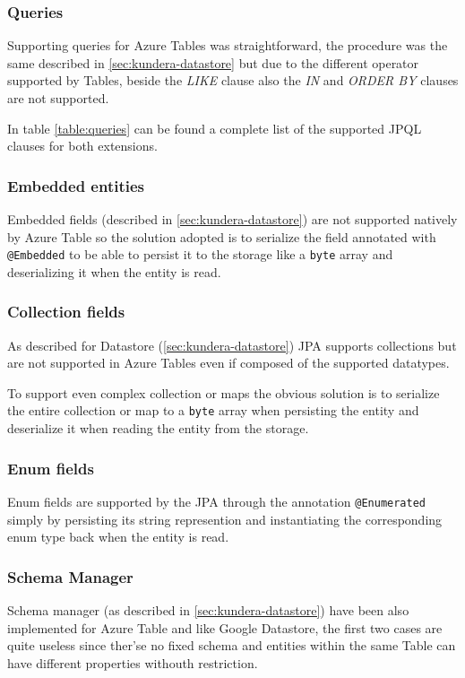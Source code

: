 \subsubsection{Queries}
Supporting queries for Azure Tables was straightforward, the procedure was the same described in \ref{sec:kundera-datastore} but due to the different operator supported by Tables, beside the \textit{LIKE} clause also the \textit{IN} and \textit{ORDER BY} clauses are not supported.

\noindent In table \ref{table:queries} can be found a complete list of the supported JPQL clauses for both extensions.

\subsubsection{Embedded entities}
Embedded fields (described in \ref{sec:kundera-datastore}) are not supported natively by Azure Table so the solution adopted is to serialize the field annotated with \texttt{@Embedded} to be able to persist it to the storage like a \texttt{byte} array and deserializing it when the entity is read.

\subsubsection{Collection fields}
As described for Datastore (\ref{sec:kundera-datastore}) JPA supports collections but are not supported in Azure Tables even if composed of the supported datatypes.

\noindent To support even complex collection or maps the obvious solution is to serialize the entire collection or map to a \texttt{byte} array when persisting the entity and deserialize it when reading the entity from the storage.

\subsubsection{Enum fields}
Enum fields are supported by the JPA through the annotation \texttt{@Enumerated}  simply by persisting its string represention and instantiating the corresponding enum type back when the entity is read.

\subsubsection{Schema Manager}
Schema manager (as described in \ref{sec:kundera-datastore}) have been also implemented for Azure Table and like Google Datastore, the first two cases are quite useless since ther'se no fixed schema and entities within the same Table can have different properties withouth restriction.


